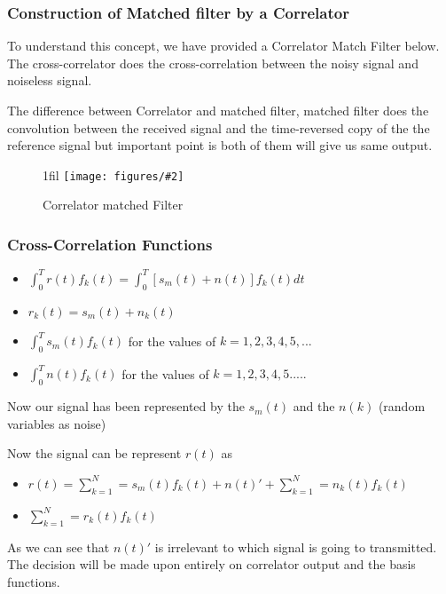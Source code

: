 \documentclass{beamer}
\makeatletter
\newcommand*{\centerfloat}{%
  \parindent \z@
  \leftskip \z@ \@plus 1fil \@minus \textwidth
  \rightskip\leftskip
  \parfillskip \z@skip}
\newcommand{\fig}[3]{
  \begin{figure}[H]
  \centerfloat
    \texttt{[image: figures/\#2]}
    \caption{#3}
  \end{figure}
}
\makeatother
\begin{document}
\begin{frame}
	\frametitle{Construction of Matched filter by a Correlator}
To understand this concept, we have provided a Correlator Match Filter below. The cross-correlator does the cross-correlation between the noisy signal and noiseless signal.

The difference between Correlator and matched filter, matched filter does the convolution between the received signal and the time-reversed copy of the the reference signal but important point is both of them will give us same output.
	\fig{3cm}{correlator_matched_filter.png}{Correlator matched Filter}
\end{frame}
\begin{frame}
	\frametitle{Cross-Correlation Functions }

\begin{itemize}
	\item $\int_{0}^{T} r(t) f_k(t)=\int_{0}^{T} [s_m(t)+n(t)] f_k(t) dt$
	\item $r_k(t)=s_m(t)+n_k(t)$
	\item $\int_{0}^{T} s_m(t) f_k(t) $ for the values of $k= 1,2,3,4,5,...$
	\item $\int_{0}^{T} n(t) f_k(t) $ for the values of $k=1,2,3,4,5.....$
\end{itemize}

Now our signal has been represented by the $s_m(t)$ and the $n(k)$ (random variables as noise)

Now the signal can be represent $r(t)$ as

\begin{itemize}
	\item $r(t)= \sum\limits_{k=1}^N = s_m(t) f_k(t)+ n(t)'+\sum\limits_{k=1}^N = n_k(t) f_k(t)$
	\item $\sum\limits_{k=1}^N = r_k(t) f_k(t)$
\end{itemize}

As we can see that $n(t)'$ is irrelevant to which signal is going to transmitted. The decision will be made upon entirely on correlator output and the basis functions.
\end{frame}
\end{document}
